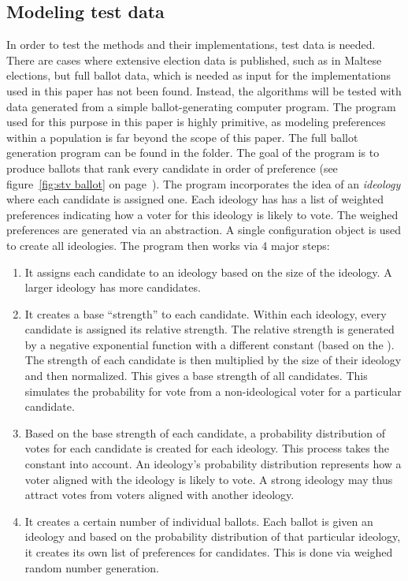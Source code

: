 \documentclass[12pt]{article}
\begin{document}
\subsection{Modeling test data}
\label{sec:vote-generation}
In order to test the methods and their implementations, test data is needed. There are cases where extensive election data is published, such as in Maltese elections, but full ballot data, which is needed as input for the implementations used in this paper has not been found. Instead, the algorithms will be tested with data generated from a simple ballot-generating computer program. The program used for this purpose in this paper is highly primitive, as modeling preferences within a population is far beyond the scope of this paper. The full ballot generation program can be found in the  folder. The goal of the program is to produce ballots that rank every candidate in order of preference (see figure~\ref{fig:stv ballot} on page~\pageref{fig:stv ballot}). The program incorporates the idea of an \textit{ideology} where each candidate is assigned one. Each ideology has has a list of weighted preferences indicating how a voter for this ideology is likely to vote. The weighed preferences are generated via an abstraction. A single configuration object is used to create all ideologies.
The program then works via 4 major steps:
\begin{enumerate}
	\item It assigns each candidate to an ideology based on the size of the ideology. A larger ideology has more candidates.
	\item It creates a base ``strength'' to each candidate. Within each ideology, every candidate is assigned its relative strength. The relative strength is generated by a negative exponential function with a different constant (based on the ). The strength of each candidate is then multiplied by the size of their ideology and then normalized. This gives a base strength of all candidates. This simulates the probability for vote from a non-ideological voter for a particular candidate.
	\item Based on the base strength of each candidate, a probability distribution of votes for each candidate is created for each ideology. This process takes  the   constant into account. An ideology's probability distribution represents how a voter aligned with the ideology is likely to vote. A strong ideology may thus attract votes from voters aligned with another ideology.
	\item It creates a certain number of individual ballots. Each ballot is given an ideology and based on the probability distribution of that particular ideology, it creates its own list of preferences for candidates. This is done via weighed random number generation.
\end{enumerate}
\end{document}
